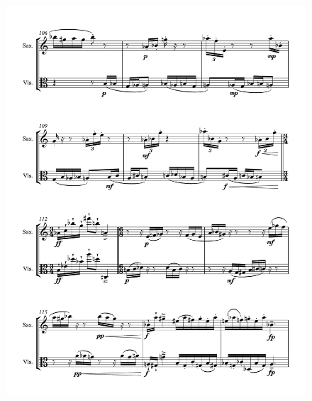\begin{figure}[htbp]
    \centering
	\includegraphics[width=6.5in]{figures/Sax_Viola_10.pdf}
\end{figure}

